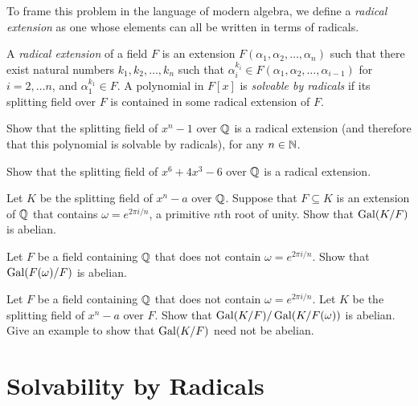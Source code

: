 To frame this problem in the language of modern algebra, we define a \textit{radical extension} as one whose elements can all be written in terms of radicals.

\begin{definition}
    A \textit{radical extension} of a field $F$ is an extension $F(\alpha_1,\alpha_2, \ldots, \alpha_n)$ such that there exist natural numbers $k_1,k_2,\ldots,k_n$ such that $\alpha_{i}^{k_i} \in F(\alpha_1,\alpha_2, \ldots, \alpha_{i-1})$ for $i = 2,\ldots n$, and $\alpha_1^{k_1} \in F$. A polynomial in $F[x]$ is \textit{solvable by radicals} if its splitting field over $F$ is contained in some radical extension of $F$.
\end{definition}

\begin{problem}
Show that the splitting field of $x^n-1$ over $\mathbb{Q}$ is a radical extension (and therefore that this polynomial is solvable by radicals), for any $n\in \mathbb{N}$.
\end{problem}



\begin{problem}
Show that the splitting field of $x^6+4x^3-6$ over $\mathbb{Q}$ is a radical extension.
\end{problem}



\begin{problem}
    Let $K$ be the splitting field of $x^n-a$ over $\mathbb{Q}$. Suppose that $F\subseteq K$ is an extension of $\mathbb{Q}$ that contains $\omega = e^{2\pi i/n}$, a primitive $n$th root of unity. Show that $\operatorname{Gal}(K/F)$ is abelian.
\end{problem}



\begin{problem}
    Let $F$ be a field containing $\mathbb{Q}$ that does not contain $\omega = e^{2\pi i/n}$. Show that $\operatorname{Gal}(F(\omega)/F)$ is abelian.
\end{problem}



\begin{problem}
    Let $F$ be a field containing $\mathbb{Q}$ that does not contain $\omega = e^{2\pi i/n}$. Let $K$ be the splitting field of $x^n-a$ over $F$. Show that $\operatorname{Gal}(K/F)/\operatorname{Gal}(K/F(\omega))$ is abelian. Give an example to show that $\operatorname{Gal}(K/F)$ need not be abelian.
\end{problem}


\section{Solvability by Radicals}

